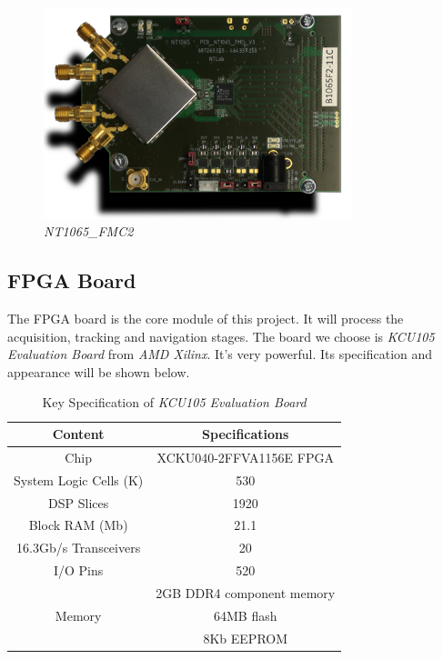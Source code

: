 \begin{figure}[!htbp]
    \centering
    \includegraphics[width=0.8\textwidth]{_IMAGES/fmc-2-nt1065.png}
    \caption{\textit{NT1065\_FMC2}}
    \label{fig:nt1065}
\end{figure}

\subsection{FPGA Board}
The FPGA board is the core module of this project. It will process the acquisition, tracking and navigation stages. The board we choose is \textit{KCU105 Evaluation Board} from \textit{AMD Xilinx}. It's very powerful. Its specification and appearance will be shown below.

\begin{table}[!htbp]
\centering
\caption{Key Specification of \textit{KCU105 Evaluation Board}}
\label{tab:kcu105}
\renewcommand\arraystretch{1.5}
\begin{tabular}{cc}
    \toprule
    Content & Specifications \\
    \midrule
    Chip & XCKU040-2FFVA1156E FPGA \\
    System Logic Cells (K) & 530 \\
    DSP Slices & \num{1920} \\
    Block RAM (Mb) & 21.1 \\
    16.3Gb/s Transceivers & 20 \\
    I/O Pins & 520 \\
    \multirow{3}{*}{Memory} & 2GB DDR4 component memory \\
     & 64MB flash \\
     & 8Kb EEPROM \\
     \bottomrule
\end{tabular}
\end{table}


